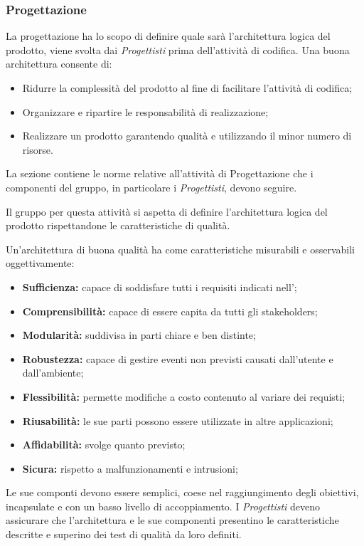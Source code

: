 \subsubsection{Progettazione}
 \label{PS_Progettazione_Scopo}
La progettazione ha lo scopo di definire quale sarà l'architettura logica del prodotto, viene svolta dai \textit{Progettisti} prima dell'attività di codifica. Una buona architettura consente di:
\begin{itemize}
	\item Ridurre la complessità del prodotto al fine di facilitare l'attività di codifica;
	\item Organizzare e ripartire le responsabilità di realizzazione;
	\item Realizzare un prodotto garantendo qualità e utilizzando il minor numero di risorse.
\end{itemize} 

La sezione contiene le norme relative all'attività di Progettazione che i componenti del gruppo, in particolare i \textit{Progettisti}, devono seguire.

Il gruppo per questa attività si aspetta di definire l'architettura logica del prodotto rispettandone le caratteristiche di qualità.

\label{QualitàProgettazione}
Un'architettura di buona qualità ha come caratteristiche misurabili e osservabili oggettivamente:
\begin{itemize}
	\item \textbf{Sufficienza: }capace di soddisfare tutti i requisiti indicati nell'\AdRv;
	\item \textbf{Comprensibilità: }capace di essere capita da tutti gli stakeholders;
	\item \textbf{Modularità: }suddivisa in parti chiare e ben distinte;
	\item \textbf{Robustezza: }capace di gestire eventi non previsti causati dall'utente e dall'ambiente;
	\item \textbf{Flessibilità: }permette modifiche a costo contenuto al variare dei requisti;
	\item \textbf{Riusabilità: }le sue parti possono essere utilizzate in altre applicazioni;
	\item \textbf{Affidabilità: }svolge quanto previsto;
	\item \textbf{Sicura: }rispetto a malfunzionamenti e intrusioni;
\end{itemize}
Le sue componti devono essere semplici, coese nel raggiungimento degli obiettivi, incapsulate e con un basso livello di accoppiamento.
I \textit{Progettisti} deveno assicurare che l'architettura e le sue componenti presentino le caratteristiche descritte e superino dei test di qualità da loro definiti.


